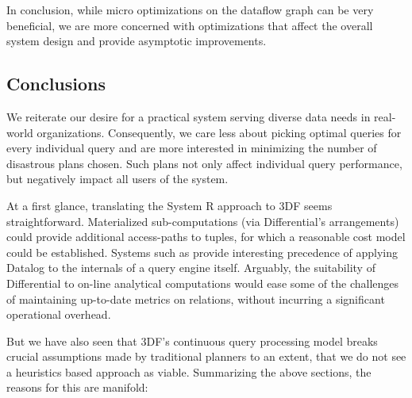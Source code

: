 \documentclass[../index.tex]{subfiles}
\begin{document}
In conclusion, while micro optimizations on the dataflow graph can be
very beneficial, we are more concerned with optimizations that affect
the overall system design and provide asymptotic improvements.

\subsection{Conclusions}

We reiterate our desire for a practical system serving diverse data
needs in real-world organizations. Consequently, we care less about
picking optimal queries for every individual query and are more
interested in minimizing the number of disastrous plans chosen. Such
plans not only affect individual query performance, but negatively
impact all users of the system.

At a first glance, translating the System R approach to 3DF seems
straightforward. Materialized sub-computations (via Differential's
arrangements) could provide additional access-paths to tuples, for
which a reasonable cost model could be established. Systems such as
\cite{condie2008evita} provide interesting precedence of applying
Datalog to the internals of a query engine itself. Arguably, the
suitability of Differential to on-line analytical computations would
ease some of the challenges of maintaining up-to-date metrics on
relations, without incurring a significant operational overhead.

But we have also seen that 3DF's continuous query processing model
breaks crucial assumptions made by traditional planners to an extent,
that we do not see a heuristics based approach as viable. Summarizing
the above sections, the reasons for this are manifold:
\end{document}
